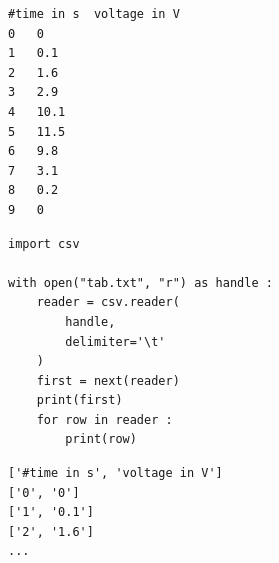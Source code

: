 
\begin{frame}[fragile]
%
\begin{tcbraster}[raster columns=2,
                  raster equal height,
                  nobeforeafter,
                  raster column skip=0.5cm]
\begin{cmdbox}
\begin{verbatim}
#time in s	voltage in V
0	0
1	0.1
2	1.6
3	2.9
4	10.1
5	11.5
6	9.8
7	3.1
8	0.2
9	0
\end{verbatim}
\end{cmdbox}
%
\begin{codebox}
\begin{verbatim}
import csv

with open("tab.txt", "r") as handle :
    reader = csv.reader(
        handle,
        delimiter='\t'
    )
    first = next(reader)
    print(first)
    for row in reader :
        print(row)
\end{verbatim}
\end{codebox}
\end{tcbraster}
%
\begin{cmdbox}
\begin{verbatim}
['#time in s', 'voltage in V']
['0', '0']
['1', '0.1']
['2', '1.6']
...
\end{verbatim}
\end{cmdbox}
%
\end{frame}



